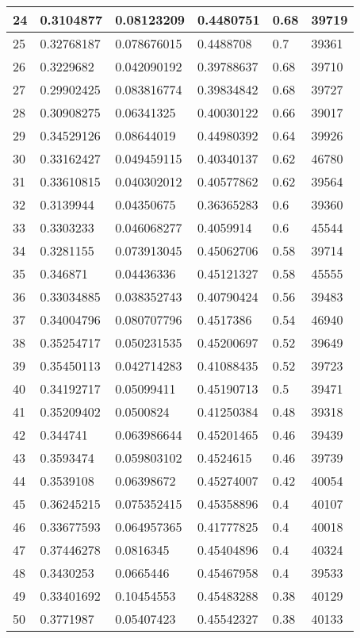 \begin{longtable}{|l|l|l|l|l|l|}
24 & 0.3104877 & 0.08123209 & 0.4480751 & 0.68 & 39719 \\ \hline 
25 & 0.32768187 & 0.078676015 & 0.4488708 & 0.7 & 39361 \\ \hline 
26 & 0.3229682 & 0.042090192 & 0.39788637 & 0.68 & 39710 \\ \hline 
27 & 0.29902425 & 0.083816774 & 0.39834842 & 0.68 & 39727 \\ \hline 
28 & 0.30908275 & 0.06341325 & 0.40030122 & 0.66 & 39017 \\ \hline 
29 & 0.34529126 & 0.08644019 & 0.44980392 & 0.64 & 39926 \\ \hline 
30 & 0.33162427 & 0.049459115 & 0.40340137 & 0.62 & 46780 \\ \hline 
31 & 0.33610815 & 0.040302012 & 0.40577862 & 0.62 & 39564 \\ \hline 
32 & 0.3139944 & 0.04350675 & 0.36365283 & 0.6 & 39360 \\ \hline 
33 & 0.3303233 & 0.046068277 & 0.4059914 & 0.6 & 45544 \\ \hline 
34 & 0.3281155 & 0.073913045 & 0.45062706 & 0.58 & 39714 \\ \hline 
35 & 0.346871 & 0.04436336 & 0.45121327 & 0.58 & 45555 \\ \hline 
36 & 0.33034885 & 0.038352743 & 0.40790424 & 0.56 & 39483 \\ \hline 
37 & 0.34004796 & 0.080707796 & 0.4517386 & 0.54 & 46940 \\ \hline 
38 & 0.35254717 & 0.050231535 & 0.45200697 & 0.52 & 39649 \\ \hline 
39 & 0.35450113 & 0.042714283 & 0.41088435 & 0.52 & 39723 \\ \hline 
40 & 0.34192717 & 0.05099411 & 0.45190713 & 0.5 & 39471 \\ \hline 
41 & 0.35209402 & 0.0500824 & 0.41250384 & 0.48 & 39318 \\ \hline 
42 & 0.344741 & 0.063986644 & 0.45201465 & 0.46 & 39439 \\ \hline 
43 & 0.3593474 & 0.059803102 & 0.4524615 & 0.46 & 39739 \\ \hline 
44 & 0.3539108 & 0.06398672 & 0.45274007 & 0.42 & 40054 \\ \hline 
45 & 0.36245215 & 0.075352415 & 0.45358896 & 0.4 & 40107 \\ \hline 
46 & 0.33677593 & 0.064957365 & 0.41777825 & 0.4 & 40018 \\ \hline 
47 & 0.37446278 & 0.0816345 & 0.45404896 & 0.4 & 40324 \\ \hline 
48 & 0.3430253 & 0.0665446 & 0.45467958 & 0.4 & 39533 \\ \hline 
49 & 0.33401692 & 0.10454553 & 0.45483288 & 0.38 & 40129 \\ \hline 
50 & 0.3771987 & 0.05407423 & 0.45542327 & 0.38 & 40133 \\ \hline 
\end{longtable}